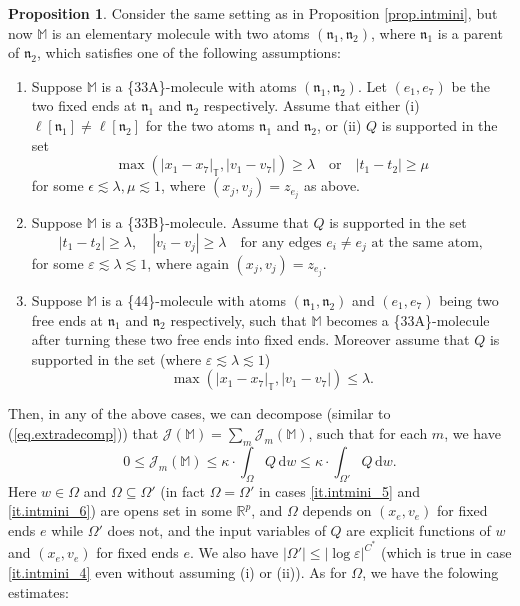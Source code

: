 \documentclass[10pt, reqno]{amsart}
\newcommand{\Mb}{\mathbb M}
\newcommand{\Rb}{\mathbb R}
\newcommand{\Tb}{\mathbb T}
\newcommand {\Jc}{\mathcal J}
\newcommand{\nf}{\mathfrak n}
\theoremstyle{definition}
\newtheorem{proposition}[theorem]{Proposition}
\theoremstyle{remark}
\numberwithin{equation}{section}
\begin{document}
\begin{proposition}\label{prop.intmini_2} Consider the same setting as in Proposition \ref{prop.intmini}, but now $\Mb$ is an elementary molecule with two atoms $(\nf_1,\nf_2)$, where $\nf_1$ is a parent of $\nf_2$, which satisfies one of the following assumptions:
\begin{enumerate}[{(a)}]
\item\label{it.intmini_4} Suppose $\Mb$ is a \{33A\}-molecule with atoms $(\nf_1,\nf_2)$. Let $(e_1,e_7)$ be the two fixed ends at $\nf_1$ and $\nf_2$ respectively. Assume that either (i) $\ell[\nf_1]\neq\ell[\nf_2]$ for the two atoms $\nf_1$ and $\nf_2$, or (ii) $Q$ is supported in the set
\begin{equation}\label{eq.intmini_8-}
\max(|x_1-x_7|_\Tb,|v_1-v_7|)\geq \lambda\quad \mathrm{or}\quad |t_1-t_2|\geq\mu
\end{equation} for some $\epsilon\lesssim\lambda,\mu\lesssim 1$, where $(x_j,v_j)=z_{e_j}$ as above.
\item\label{it.intmini_5} Suppose $\Mb$ is a \{33B\}-molecule. Assume that $Q$ is supported in the set
\begin{equation}\label{eq.intmini_9-}
|t_1-t_2|\geq \lambda,\quad |v_i-v_j|\geq \lambda\quad\textrm{for\ any\ edges\ }e_i\neq e_j\textrm{\ at\ the\ same\ atom},
\end{equation}for some $\varepsilon\lesssim\lambda\lesssim 1$, where again $(x_j,v_j)=z_{e_j}$.
\item\label{it.intmini_6} Suppose $\Mb$ is a \{44\}-molecule with atoms $(\nf_1,\nf_2)$ and $(e_1,e_7)$ being two free ends at $\nf_1$ and $\nf_2$ respectively, such that $\Mb$ becomes a \{33A\}-molecule after turning these two free ends into fixed ends. Moreover assume that $Q$ is supported in the set (where $\varepsilon\lesssim\lambda\lesssim1$)
\begin{equation}\label{it.intmini_10-}
\max(|x_1-x_7|_\Tb,|v_1-v_7|)\leq \lambda.
\end{equation}
\end{enumerate}
Then, in any of the above cases, we can decompose (similar to (\ref{eq.extradecomp})) that $\Jc(\Mb)=\sum_m \Jc_m(\Mb)$, such that for each $m$, we have
\begin{equation}\label{eq.intmini_8}
0\leq\Jc_m(\Mb)\leq\kappa\cdot\int_\Omega Q\,\mathrm{d}w\leq\kappa\cdot\int_{\Omega'}Q\,\mathrm{d}w.
\end{equation} Here $w\in\Omega$ and $\Omega\subseteq\Omega'$ (in fact $\Omega=\Omega'$ in cases \ref{it.intmini_5} and \ref{it.intmini_6}) are opens set in some $\Rb^p$, and $\Omega$ depends on $(x_e,v_e)$ for fixed ends $e$ while $\Omega'$ does not, and the input variables of $Q$ are explicit functions of $w$ and $(x_e,v_e)$ for fixed ends $e$. We also have $|\Omega'|\leq |\log\varepsilon|^{C^*}$ (which is true in case \ref{it.intmini_4} even without assuming (i) or (ii)). As for $\Omega$, we have the folowing estimates:

\end{proposition}
\end{document}

